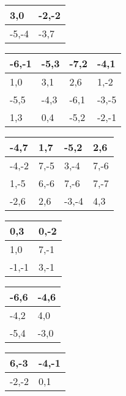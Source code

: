 \documentclass{article}
\begin{document}
\begin{table}[]
\centering
\begin{tabular}{|l|l|}
\hline3,0 & -2,-2\\ \hline
-5,-4 & -3,7\\ \hline
\end{tabular}
\end{table}

\begin{table}[]
\centering
\begin{tabular}{|l|l|l|l|}
\hline-6,-1 & -5,3 & -7,2 & -4,1\\ \hline
1,0 & 3,1 & 2,6 & 1,-2\\ \hline
-5,5 & -4,3 & -6,1 & -3,-5\\ \hline
1,3 & 0,4 & -5,2 & -2,-1\\ \hline
\end{tabular}
\end{table}

\begin{table}[]
\centering
\begin{tabular}{|l|l|l|l|}
\hline-4,7 & 1,7 & -5,2 & 2,6\\ \hline
-4,-2 & 7,-5 & 3,-4 & 7,-6\\ \hline
1,-5 & 6,-6 & 7,-6 & 7,-7\\ \hline
-2,6 & 2,6 & -3,-4 & 4,3\\ \hline
\end{tabular}
\end{table}

\begin{table}[]
\centering
\begin{tabular}{|l|l|}
\hline0,3 & 0,-2\\ \hline
1,0 & 7,-1\\ \hline
-1,-1 & 3,-1\\ \hline
\end{tabular}
\end{table}

\begin{table}[]
\centering
\begin{tabular}{|l|l|}
\hline-6,6 & -4,6\\ \hline
-4,2 & 4,0\\ \hline
-5,4 & -3,0\\ \hline
\end{tabular}
\end{table}

\begin{table}[]
\centering
\begin{tabular}{|l|l|}
\hline6,-3 & -4,-1\\ \hline
-2,-2 & 0,1\\ \hline
\end{tabular}
\end{table}
\end{document}
